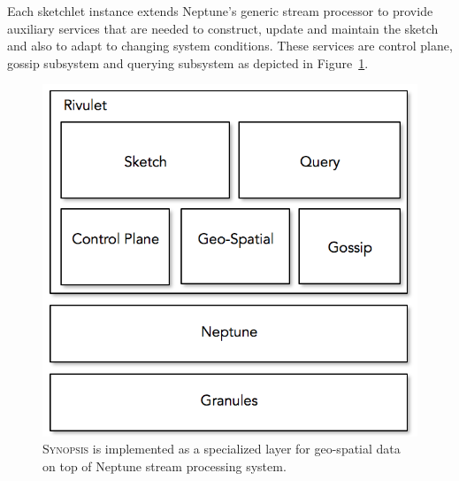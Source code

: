 Each sketchlet instance extends Neptune’s generic stream processor to provide auxiliary services that are needed to construct, update and maintain the sketch and also to adapt to changing system conditions.
These services are control plane, gossip subsystem and querying subsystem as depicted in Figure~\ref{fig:rivulet-archi}.
%
\begin{figure}
    \centerline{\includegraphics[scale=0.5]{figures/rivulet-archi.png}}
    \caption{\textsc{Synopsis} is implemented as a specialized layer for geo-spatial data on top of Neptune stream processing system.}
    \label{fig:rivulet-archi}
\end{figure}
%
